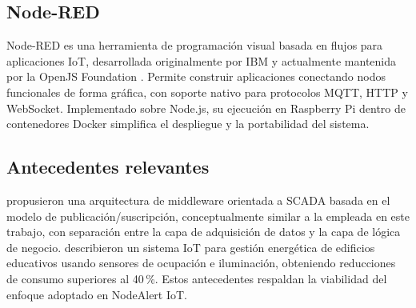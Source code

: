 \subsection{Node-RED}

Node-RED es una herramienta de programación visual basada en flujos para aplicaciones
IoT, desarrollada originalmente por IBM y actualmente mantenida por la OpenJS
Foundation \parencite{NodeRED2024}. Permite construir aplicaciones conectando nodos
funcionales de forma gráfica, con soporte nativo para protocolos MQTT, HTTP y WebSocket.
Implementado sobre Node.js, su ejecución en Raspberry Pi dentro de contenedores Docker
simplifica el despliegue y la portabilidad del sistema.

\subsection{Antecedentes relevantes}

\textcite{Cardiel2012} propusieron una arquitectura de middleware orientada a SCADA
basada en el modelo de publicación/suscripción, conceptualmente similar a la empleada
en este trabajo, con separación entre la capa de adquisición de datos y la capa de
lógica de negocio. \textcite{Jia2019} describieron un sistema IoT para gestión
energética de edificios educativos usando sensores de ocupación e iluminación,
obteniendo reducciones de consumo superiores al 40\,\%. Estos antecedentes respaldan
la viabilidad del enfoque adoptado en NodeAlert IoT.
